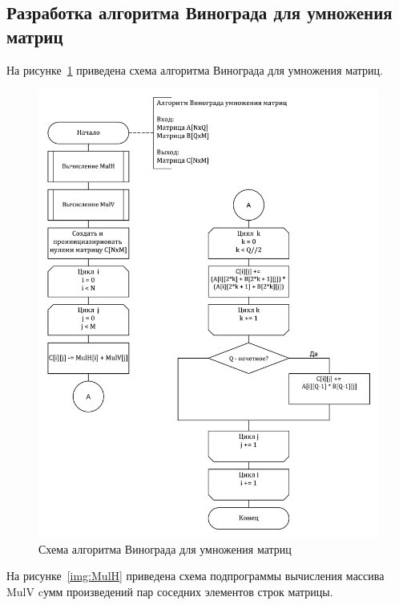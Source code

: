 \subsection{Разработка алгоритма Винограда для умножения матриц}

На рисунке~\ref{img:WinMult} приведена схема алгоритма Винограда для умножения матриц.

\begin{figure}[H]
	\centering
	\includegraphics[height=0.8\textheight]{images/WinMult.pdf}
	\caption{Схема алгоритма Винограда для умножения матриц}
	\label{img:WinMult}
\end{figure}
\clearpage

На рисунке~\ref{img:MulH} приведена схема подпрограммы вычисления массива MulV cумм произведений пар соседних элементов строк матрицы.

